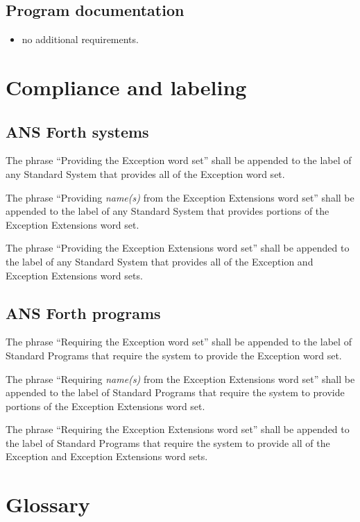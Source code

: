 \subsection{Program documentation} %
\begin{itemize}
\item no additional requirements.
\end{itemize}

\section{Compliance and labeling} %

\subsection{ANS Forth systems} %

The phrase ``Providing the Exception word set'' shall be appended to
the label of any Standard System that provides all of the Exception
word set.

The phrase ``Providing \emph{name(s)} from the Exception Extensions
word set'' shall be appended to the label of any Standard System
that provides portions of the Exception Extensions word set.

The phrase ``Providing the Exception Extensions word set'' shall be
appended to the label of any Standard System that provides all of
the Exception and Exception Extensions word sets.

\subsection{ANS Forth programs} %

The phrase ``Requiring the Exception word set'' shall be appended
to the label of Standard Programs that require the system to provide
the Exception word set.

The phrase ``Requiring \emph{name(s)} from the Exception Extensions
word set'' shall be appended to the label of Standard Programs that
require the system to provide portions of the Exception Extensions
word set.

The phrase ``Requiring the Exception Extensions word set'' shall be
appended to the label of Standard Programs that require the system
to provide all of the Exception and Exception Extensions word sets.

\section{Glossary} %


